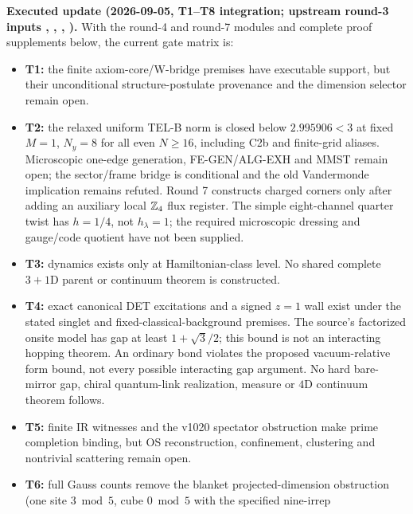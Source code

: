 \par\smallskip\noindent\textbf{Executed update (2026-09-05, T1--T8 integration; upstream round-3 inputs
,
,
,
).}
With the round-4 and round-7 modules and complete proof supplements below, the current
gate matrix is:
\begin{itemize}
\item \textbf{T1:} the finite axiom-core/W-bridge premises have executable
  support, but their unconditional structure-postulate provenance and the
  dimension selector remain open.
\item \textbf{T2:} the relaxed uniform TEL-B norm is closed below $2.995906<3$
  at fixed $M=1$, $N_y=8$ for all even $N\ge16$, including C2b and finite-grid aliases. Microscopic
  one-edge generation, FE-GEN/ALG-EXH and MMST remain open; the sector/frame
  bridge is conditional and the old Vandermonde implication remains refuted.
  Round 7 constructs charged corners only after adding an auxiliary local
  $\mathbb Z_4$ flux register. The simple eight-channel quarter twist has
  $h=1/4$, not $h_\lambda=1$; the required microscopic dressing and
  gauge/code quotient have not been supplied.
\item \textbf{T3:} dynamics exists only at Hamiltonian-class level.  No shared
  complete $3{+}1$D parent or continuum theorem is constructed.
\item \textbf{T4:} exact canonical DET excitations and a signed $z=1$ wall
  exist under the stated singlet and fixed-classical-background premises.
  The source's factorized onsite model has gap at least $1+\sqrt3/2$;
  this bound is not an interacting hopping theorem. An ordinary bond
  violates the proposed vacuum-relative form bound, not every possible
  interacting gap argument. No hard bare-mirror gap, chiral quantum-link realization, measure or
  $4$D continuum theorem follows.
\item \textbf{T5:} finite IR witnesses and the v1020 spectator obstruction make
  prime completion binding, but OS reconstruction, confinement, clustering and
  nontrivial scattering remain open.
\item \textbf{T6:} full Gauss counts remove the blanket projected-dimension
  obstruction (one site $3\bmod5$, cube $0\bmod5$ with the specified nine-irrep

\end{itemize}
